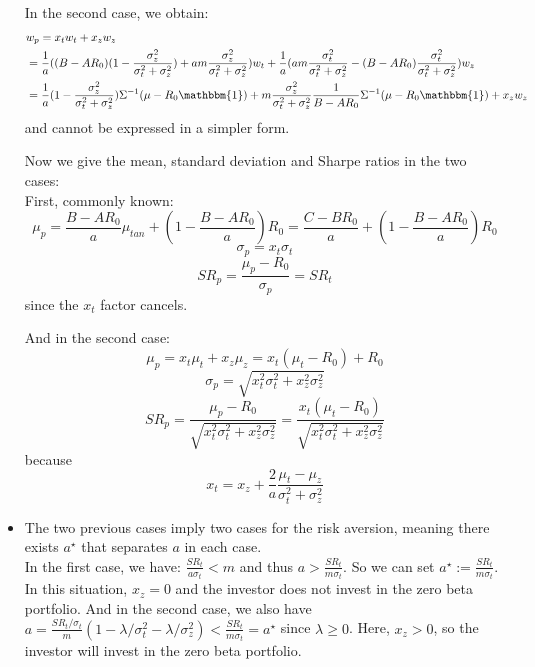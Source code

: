 \documentclass[10pt]{article}
\newenvironment{exercise}[2][Exercise]{\begin{trivlist}
  \item[\hskip \labelsep {\bfseries #1}\hskip \labelsep {\bfseries #2.}]}{\end{trivlist}}
\begin{document}
\begin{exercise}{1}
\begin{itemize}
    In the second case, we obtain: 
  \begin{align*} 
  &w_p = x_tw_t + x_zw_z \\ 
  &= \frac{1}{a}((B-AR_0)(1-\frac{\sigma_z^2}{\sigma_t^2+\sigma_z^2})+ am\frac{\sigma_z^2}{\sigma_t^2+\sigma_z^2})w_t + \frac{1}{a}(am\frac{\sigma_t^2}{\sigma_t^2+\sigma_z^2}-(B-AR_0)\frac{\sigma_t^2}{\sigma_t^2+\sigma_z^2})w_z \\
  &= \frac{1}{a}(1 - \frac{\sigma_z^2}{\sigma_t^2+\sigma_z^2})\Sigma^{-1}(\mu-R_0\mathbbm{1}) + m\frac{\sigma_z^2}{\sigma_t^2+\sigma_z^2}\frac{1}{B-AR_0}\Sigma^{-1}(\mu-R_0\mathbbm{1}) + x_zw_z
  \end{align*} and cannot be expressed in a simpler form. 

  Now we give the mean, standard deviation and Sharpe ratios in the two cases:
  \\
  First, commonly known: 
  $$ \mu_p = \frac{B-AR_0}{a}\mu_{tan} + (1-\frac{B-AR_0}{a})R_0  = \frac{C-BR_0}{a} + (1-\frac{B-AR_0}{a})R_0$$
  $$ \sigma_p = x_t\sigma_t$$
  $$ SR_p = \frac{\mu_p-R_0}{\sigma_p} = SR_t $$ since the $x_t$ factor cancels.
  
  And in the second case:
  $$ \mu_p = x_t\mu_t + x_z\mu_z = x_t(\mu_t -R_0) + R_0$$
  $$ \sigma_p = \sqrt{x_t^2\sigma_t^2 + x_z^2\sigma_z^2}$$
  $$ SR_p = \frac{\mu_p -R_0 }{\sqrt{x_t^2\sigma_t^2 + x_z^2\sigma_z^2}} = \frac{x_t(\mu_t-R_0)}{\sqrt{x_t^2\sigma_t^2 + x_z^2\sigma_z^2}}$$
because $$ x_t = x_z +  \frac{2}{a}\frac{\mu_t-\mu_z}{\sigma_t^2+\sigma_z^2}$$
\item The two previous cases imply two cases for the risk aversion, meaning there exists $a^\star$ that separates $a$ in each case. 
\\
In the first case, we have: $\frac{SR_t}{a\sigma_t} < m$ and thus $a > \frac{SR_t}{m\sigma_t}$. So we can set $a^\star :=  \frac{SR_t}{m\sigma_t}$. In this situation, $x_z = 0$ and the investor does not invest in the zero beta portfolio. And in the second case, we also have $a = \frac{SR_t/\sigma_t}{m}(1-\lambda/\sigma_t^2-\lambda/\sigma_z^2) < \frac{SR_t}{m\sigma_t} = a^\star$ since $\lambda \geq 0$. Here, $x_z >0$, so the investor will invest in the zero beta portfolio. 


\end{itemize}
\end{exercise}
\end{document}

